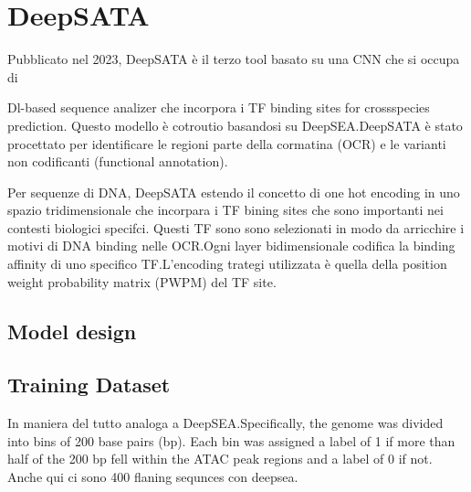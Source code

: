 \section{DeepSATA}\label{sec:DeepSATA}
% 
Pubblicato nel 2023, DeepSATA è il terzo tool basato su una \acs{CNN} che si occupa di


Dl-based sequence analizer che incorpora i TF binding sites for crossspecies prediction. Questo modello è cotroutio basandosi su DeepSEA.\@ DeepSATA è stato procettato per identificare le regioni parte della cormatina (OCR) e le varianti non codificanti (functional annotation).

Per sequenze di DNA, DeepSATA estendo il concetto di one hot encoding in uno spazio tridimensionale che incorpara i TF bining sites che sono importanti nei contesti biologici specifci. Questi TF sono sono selezionati in modo da arricchire i motivi di DNA binding nelle OCR.\@ Ogni layer bidimensionale codifica la binding affinity di uno specifico TF.\@ L'encoding trategi utilizzata è quella della position weight probability matrix (PWPM) del TF site.

\subsection*{Model design}


\subsection*{Training Dataset}

In maniera del tutto analoga a DeepSEA.\@ Specifically, the genome was divided into bins of 200 base pairs (bp). Each bin was assigned a label of 1 if more than half of the 200 bp fell within the ATAC peak regions and a label of 0 if not. Anche qui ci sono 400 flaning sequnces con deepsea.


\begin{comment}
\section{Codifica}

\section{Struttura della rete}

\section{Dataset}
\end{comment}




